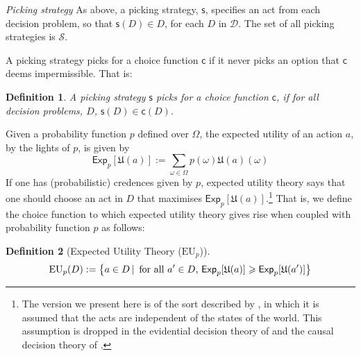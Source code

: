 \documentclass[a4paper]{article}
\newtheorem{definition}{Definition}
\newcommand\A{\mathcal{A}}
\newcommand\Exp{\mathsf{Exp}}
\newcommand\EU{\mathrm{EU}}
\newcommand\U{\mathfrak{U}} %
\newcommand{\D}{\mathcal{D}}
\renewcommand\S{\mathcal{S}}
\newcommand\s{\mathsf{s}}
\renewcommand\c{\mathsf{c}} %
\newcommand{\todoold}[2][]{\todo[backgroundcolor=white,bordercolor=orange!10,linecolor=gray!10, #1,caption={},textcolor=gray]{Pre-rev: #2}}
\newcommand{\todooldinfo}[2][]{\todoold[#1]{#2}}
\newcommand\SetDelimiter[1][]{
	\nonscript\,#1\vert \allowbreak \nonscript\,\mathopen{}}
\providecommand\given{\SetDelimiter}
\renewcommand{\emptyset}{\varnothing}
\renewcommand{\geq}{\geqslant}
\newenvironment{CCM rewritten}
{\begingroup\color{blue}} %
{\endgroup}              %
\begin{document}









\emph{Picking strategy } As above, a picking strategy, $\s$, specifies an act from each decision problem, so that $\s(D)\in D$, for each $D$ in $\D$. The set of all picking strategies is $\S$.

A picking strategy picks for a choice function $\c$ if it never picks an option that $\c$ deems impermissible. That is: 
\begin{definition}\label{def:picks for}
	A picking strategy $\s$ \emph{picks for a choice function} $\c$, if for all decision problems, $D$, $\s(D) \in \c(D)$.
\end{definition}


Given a probability function $p$ defined over $\Omega$, the expected utility of an action $a$, by the lights of $p$, is given by \begin{equation}
	\Exp_p [\U(a)]:=\sum_{\omega\in\Omega}p(\omega)\U(a)(\omega)
\end{equation}
If one has (probabilistic) credences given by $p$, expected utility theory says that one should choose an act in $D$ that maximises $\Exp_p[\U(a)]$.\footnote{The version we present here is of the sort described by \citet{savage1954fs}, in which it is assumed that the acts are independent of the states of the world. This assumption is dropped in the evidential decision theory of \citet{jeffrey1965lod} and the causal decision theory of \citet{stalnaker1972ldl, gibbard1978ctk, joyce1999fcdt}.} That is, we define the choice function to which expected utility theory gives rise when coupled with probability function $p$ as follows:

\begin{definition}[Expected Utility Theory ($\EU_p$)]\label{def:EU}
	\[\EU_p(D):=\left \{a\in D\given \text{ for all $a'\in D$, }\Exp_p[\U(a)]\geq \Exp_p[\U(a')]\right \}\]
\end{definition}
\end{document}

